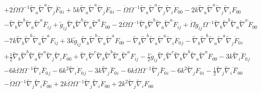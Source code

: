 \documentclass[10pt,letterpaper]{article}
\numberwithin{equation}{section}
\begin{document}
\begin{eqnarray}
&& + 2 \dot{\Omega} \Omega^{-1} \tilde{\nabla}_{a}\tilde{\nabla}^{a}\tilde{\nabla}_{j}\overset{..}{F}_{0}{}_{i} + 5 k \tilde{\nabla}_{a}\tilde{\nabla}^{a}\tilde{\nabla}_{j}\dot{F}_{0}{}_{i} -  \dot{\Omega} \Omega^{-1} \tilde{\nabla}_{a}\tilde{\nabla}^{a}\tilde{\nabla}_{j}\tilde{\nabla}_{i}\dot{F}_{00}{} - 2 k \tilde{\nabla}_{a}\tilde{\nabla}^{a}\tilde{\nabla}_{j}\tilde{\nabla}_{i}F_{00}{} \nonumber \\ 
&& -  \tilde{\nabla}_{b}\tilde{\nabla}^{b}\tilde{\nabla}_{a}\tilde{\nabla}^{a}\overset{..}{F}_{ij} + \tilde{g}_{ij} \tilde{\nabla}_{b}\tilde{\nabla}^{b}\tilde{\nabla}_{a}\tilde{\nabla}^{a}\overset{..}{F}_{00}{} - 2 \dot{\Omega} \Omega^{-1} \tilde{\nabla}_{b}\tilde{\nabla}^{b}\tilde{\nabla}_{a}\tilde{\nabla}^{a}\dot{F}_{ij} + \dot{\Omega} \tilde{g}_{ij} \Omega^{-1} \tilde{\nabla}_{b}\tilde{\nabla}^{b}\tilde{\nabla}_{a}\tilde{\nabla}^{a}\dot{F}_{00}{} \nonumber \\ 
&& - 7 k \tilde{\nabla}_{b}\tilde{\nabla}^{b}\tilde{\nabla}_{a}\tilde{\nabla}^{a}F_{ij} + 3 k \tilde{g}_{ij} \tilde{\nabla}_{b}\tilde{\nabla}^{b}\tilde{\nabla}_{a}\tilde{\nabla}^{a}F_{00}{} -  \tilde{\nabla}_{b}\tilde{\nabla}^{b}\tilde{\nabla}_{a}\tilde{\nabla}^{a}\tilde{\nabla}_{i}\dot{F}_{0}{}_{j} -  \tilde{\nabla}_{b}\tilde{\nabla}^{b}\tilde{\nabla}_{a}\tilde{\nabla}^{a}\tilde{\nabla}_{j}\dot{F}_{0}{}_{i} \nonumber \\ 
&& + \tfrac{1}{2} \tilde{\nabla}_{b}\tilde{\nabla}^{b}\tilde{\nabla}_{a}\tilde{\nabla}^{a}\tilde{\nabla}_{j}\tilde{\nabla}_{i}F_{00}{} + \tilde{\nabla}_{c}\tilde{\nabla}^{c}\tilde{\nabla}_{b}\tilde{\nabla}^{b}\tilde{\nabla}_{a}\tilde{\nabla}^{a}F_{ij} -  \tfrac{1}{2} \tilde{g}_{ij} \tilde{\nabla}_{c}\tilde{\nabla}^{c}\tilde{\nabla}_{b}\tilde{\nabla}^{b}\tilde{\nabla}_{a}\tilde{\nabla}^{a}F_{00}{} - 3 k \tilde{\nabla}_{i}\overset{...}{F}_{0}{}_{j} \nonumber \\ 
&& - 6 k \dot{\Omega} \Omega^{-1} \tilde{\nabla}_{i}\overset{..}{F}_{0}{}_{j} - 6 k^2 \tilde{\nabla}_{i}\dot{F}_{0}{}_{j} - 3 k \tilde{\nabla}_{j}\overset{...}{F}_{0}{}_{i} - 6 k \dot{\Omega} \Omega^{-1} \tilde{\nabla}_{j}\overset{..}{F}_{0}{}_{i} - 6 k^2 \tilde{\nabla}_{j}\dot{F}_{0}{}_{i} -  \tfrac{1}{2} \tilde{\nabla}_{j}\tilde{\nabla}_{i}\overset{....}{F}_{00}{} \nonumber \\ 
&& -  \dot{\Omega} \Omega^{-1} \tilde{\nabla}_{j}\tilde{\nabla}_{i}\overset{...}{F}_{00}{} + 2 k \dot{\Omega} \Omega^{-1} \tilde{\nabla}_{j}\tilde{\nabla}_{i}\dot{F}_{00}{} + 2 k^2 \tilde{\nabla}_{j}\tilde{\nabla}_{i}F_{00}{}
\label{Deltatt}
\end{eqnarray}
\end{document}
